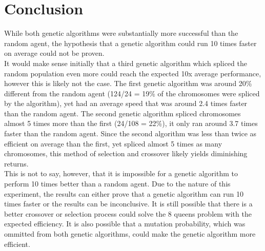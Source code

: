 \documentclass[a4paper]{article}
\begin{document}
\section{Conclusion}
While both genetic algorithms were substantially more successful than the random agent, the hypothesis that a genetic algorithm could run 10 times faster on average could not be proven.\\

It would make sense initially that a third genetic algorithm which spliced the random population even more could reach the expected 10x average performance, however this is likely not the case. The first genetic algorithm was around 20\% different from the random agent (124/24 = 19\% of the chromosomes were spliced by the algorithm), yet had an average speed that was around 2.4 times faster than the random agent. The second genetic algorithm spliced chromosomes almost 5 times more than the first (24/108 = 22\%), it only ran around 3.7 times faster than the random agent. Since the second algorithm was less than twice as efficient on average than the first, yet spliced almost 5 times as many chromosomes, this method of selection and crossover likely yields diminishing returns.\\

This is not to say, however, that it is impossible for a genetic algorithm to perform 10 times better than a random agent. Due to the nature of this experiment, the results can either prove that a genetic algorithm can run 10 times faster or the results can be inconclusive. It is still possible that there is a better crossover or selection process could solve the 8 queens problem with the expected efficiency. It is also possible that a mutation probability, which was ommitted from both genetic algorithms, could make the genetic algorithm more efficient.
\end{document}
